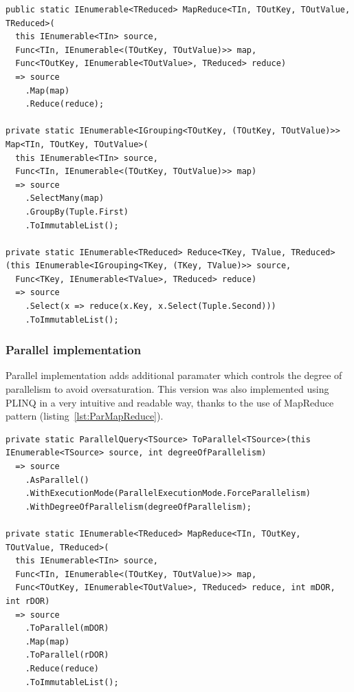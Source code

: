 \begin{lstlisting}[language={[sharp]c}, style=sharpcstyle, caption={Sequential \texttt{MapReduce} implementation}, label={lst:SeqMapReduce},
numbers=none, xleftmargin=0pt,framexleftmargin=0pt,framexrightmargin=0pt,framexbottommargin=0pt]
public static IEnumerable<TReduced> MapReduce<TIn, TOutKey, TOutValue, TReduced>(
  this IEnumerable<TIn> source,
  Func<TIn, IEnumerable<(TOutKey, TOutValue)>> map,
  Func<TOutKey, IEnumerable<TOutValue>, TReduced> reduce)
  => source
    .Map(map)
    .Reduce(reduce);

private static IEnumerable<IGrouping<TOutKey, (TOutKey, TOutValue)>> Map<TIn, TOutKey, TOutValue>(
  this IEnumerable<TIn> source,
  Func<TIn, IEnumerable<(TOutKey, TOutValue)>> map)
  => source
    .SelectMany(map)
    .GroupBy(Tuple.First)
    .ToImmutableList();

private static IEnumerable<TReduced> Reduce<TKey, TValue, TReduced>
(this IEnumerable<IGrouping<TKey, (TKey, TValue)>> source,
  Func<TKey, IEnumerable<TValue>, TReduced> reduce)
  => source
    .Select(x => reduce(x.Key, x.Select(Tuple.Second)))
    .ToImmutableList();

\end{lstlisting}

\subsubsection{Parallel implementation}
Parallel implementation adds additional paramater which controls the degree of parallelism to avoid oversaturation. This version was also implemented using PLINQ in a very intuitive and readable way, thanks to the use of MapReduce pattern (listing~\ref{lst:ParMapReduce}).

\begin{lstlisting}[language={[sharp]c}, style=sharpcstyle, caption={Parallel \texttt{MapReduce} implementation}, label={lst:ParMapReduce},
numbers=none, xleftmargin=0pt,framexleftmargin=0pt,framexrightmargin=0pt,framexbottommargin=0pt]
private static ParallelQuery<TSource> ToParallel<TSource>(this IEnumerable<TSource> source, int degreeOfParallelism)
  => source
    .AsParallel()
    .WithExecutionMode(ParallelExecutionMode.ForceParallelism)
    .WithDegreeOfParallelism(degreeOfParallelism);

private static IEnumerable<TReduced> MapReduce<TIn, TOutKey, TOutValue, TReduced>(
  this IEnumerable<TIn> source,
  Func<TIn, IEnumerable<(TOutKey, TOutValue)>> map,
  Func<TOutKey, IEnumerable<TOutValue>, TReduced> reduce, int mDOR, int rDOR)
  => source
    .ToParallel(mDOR)
    .Map(map)
    .ToParallel(rDOR)
    .Reduce(reduce)
    .ToImmutableList();
\end{lstlisting}

